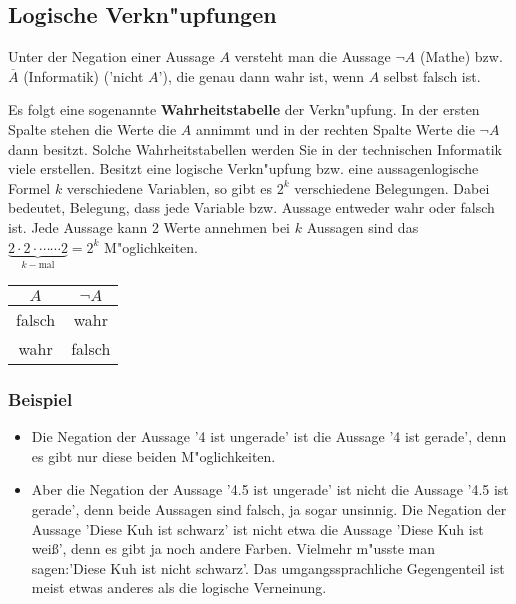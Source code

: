 \subsection{Logische Verkn"upfungen}
\begin{definition}[Negation]
Unter der Negation einer Aussage $A$ versteht man die Aussage $\neg A$ (Mathe) bzw. $\overline{A}$ (Informatik) ('nicht $A$'), die genau dann wahr ist, wenn $A$ selbst falsch ist.
\end{definition}
Es folgt eine sogenannte \textbf{Wahrheitstabelle} der Verkn"upfung. In der ersten Spalte stehen die Werte die $A$ annimmt und in der rechten Spalte Werte die $\neg A$ dann besitzt. Solche Wahrheitstabellen werden Sie in der technischen Informatik viele erstellen. Besitzt eine logische Verkn"upfung bzw. eine aussagenlogische Formel $k$ verschiedene Variablen, so gibt es $2^k$ verschiedene Belegungen. Dabei bedeutet, Belegung, dass jede Variable bzw. Aussage entweder wahr oder falsch ist. Jede Aussage kann 2 Werte annehmen bei $k$ Aussagen sind das $\underbrace{2 \cdot 2 \cdot \cdots \cdots 2}_{k-\text{mal}} = 2^k$ M"oglichkeiten.
\begin{center}
\begin{tabular}{c||c}
 $A$ & $\neg A$  \\ 
\hline
\cellcolor{ared}falsch  & \cellcolor{agreen}wahr   \\ 
\cellcolor{agreen}wahr  & \cellcolor{ared} falsch  \\ 
\hline
\end{tabular}
\end{center}

\subsubsection*{Beispiel}
\begin{itemize}
	\item Die Negation der Aussage '4 ist ungerade' ist die Aussage '4 ist gerade', denn es gibt nur diese beiden M"oglichkeiten.
	\item Aber die Negation der Aussage '4.5 ist ungerade' ist nicht die Aussage '4.5 ist gerade', denn beide Aussagen sind falsch, ja sogar unsinnig. Die Negation der Aussage 'Diese Kuh ist schwarz' ist nicht etwa die Aussage 'Diese Kuh ist wei{\ss}', denn es gibt ja noch andere Farben. Vielmehr m"usste man sagen:'Diese Kuh ist nicht schwarz'. Das umgangssprachliche Gegengenteil ist meist etwas anderes als die logische Verneinung.
\end{itemize}

